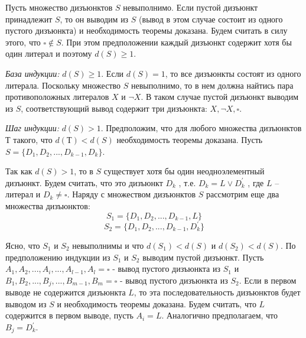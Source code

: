\documentclass[12pt, a4paper]{article}
\begin{document}
	 \par Пусть множество дизъюнктов $S$ невыполнимо. Если пустой дизъюнкт принадлежит $S$, то он выводим из $S$ (вывод в этом случае состоит из одного пустого дизъюнкта) и необходимость теоремы доказана. Будем считать в силу этого, что $\square \notin S$. При этом предположении каждый дизъюнкт содержит хотя бы один литерал и поэтому $d(S) \geq 1$.
	 \par \textit{База индукции:} $d(S) \geq 1$. Если $d(S) = 1$, то все дизъюнкты состоят из одного литерала. Поскольку множество $S$ невыполнимо, то в нем должна найтись пара противоположных литералов $X$ и $\neg X$. В таком случае пустой дизъюнкт выводим из $S$, соответствующий вывод содержит три дизъюнкта: $X, \neg X, \square$.
	 \par \textit{Шаг индукции:} $d(S) > 1$. Предположим, что для любого множества дизъюнктов $Т$ такого, что $d(Т)<d(S)$ необходимость теоремы доказана. Пусть $S = \{D_{1}, D_{2}, ... , D_{k-1}, D_{k}  \}$.
	 \par Так как $d(S)>1$, то в $S$ существует хотя бы один неодноэлементный дизъюнкт. Будем считать, что это дизъюнкт $D_{k}$ , т.е. $D_{k} = L \lor D_{k}^\prime$ , где $L$ – литерал и $D_{k} \neq \square $. Наряду с множеством дизъюнктов $S$ рассмотрим еще два множества дизъюнктов:
	 \[
	 S_{1} = \{D_{1}, D_{2}, ... , D_{k-1}, L\}
	 \]
	 \[
	 S_{2} = \{D_{1}, D_{2}, ... , D_{k-1}, D_{k}^\prime \}
	 \]
	 \par Ясно, что $S_{1}$ и $S_{2}$ невыполнимы и что $d(S_{1})<d(S)$ и $d(S_{2}) < d(S)$. По предположению индукции из $S_{1} \text{ и } S_{2}$ выводим пустой дизъюнкт. Пусть $A_{1}, A_{2}, ... , A_{i}, ... , A_{l-1}, A_{l} = \square$ - вывод пустого дизъюнкта из $S_{1}$ и $B_{1}, B_{2}, ... , B_{j}, ... , B_{m-1}, B_{m} = \square$ - вывод пустого дизъюнкта из $S_{2}$. Если в первом выводе не содержится дизъюнкта $L$, то эта последовательность дизъюнктов будет выводом из $S$ и необходимость теоремы доказана. Будем считать, что $L$ содержится в первом выводе, пусть $A_{i} = L$. Аналогично предполагаем, что $B_{j} = D_{k}^\prime$. 
\end{document}
